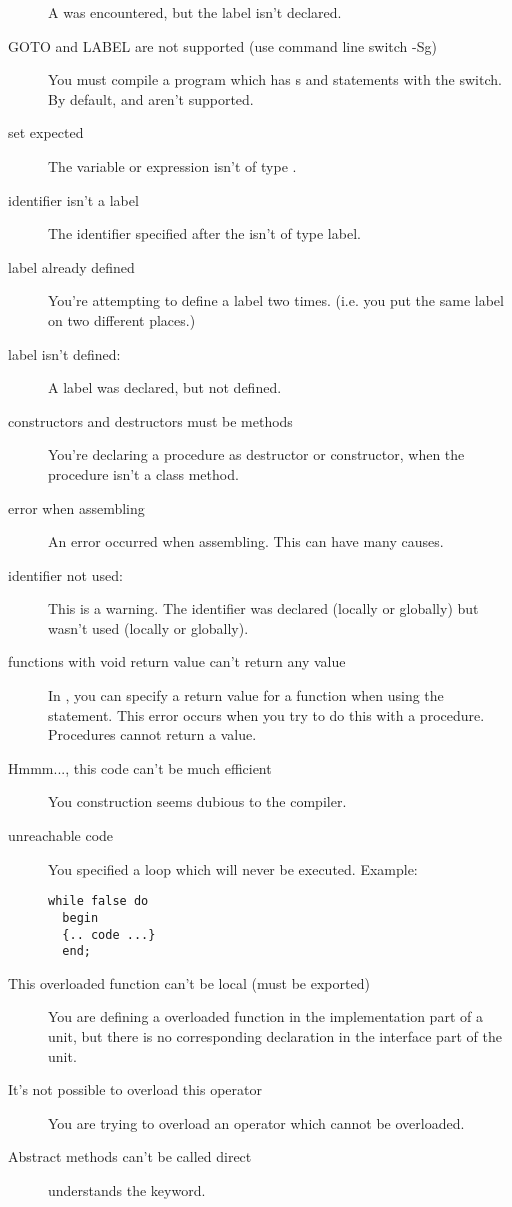 \documentclass{report}
\begin{document}
\begin{description}
A  was encountered, but the label isn't declared. 
\item [GOTO and LABEL are not supported (use command line switch -Sg)]
You must compile a program which has s and  statements 
with the   switch. By default,  and  aren't
supported.
\item [set expected]
The variable or expression isn't of type .
\item [identifier isn't a label]
The identifier specified after the  isn't of type label.
\item [label already defined]
You're attempting to define a label two times. (i.e. you put the same label
on two different places.)
\item [label isn't defined:]
A label was declared, but not defined.
\item [constructors and destructors must be methods]
You're declaring a procedure as destructor or constructor, when the
procedure isn't a class method.
\item [error when assembling]
An error occurred when assembling. This can have many causes.
\item [identifier not used:]
This is a warning. The identifier was declared (locally or globally) but
wasn't used (locally or globally).
\item [functions with void return value can't return any value]
In \fpc, you can specify a return value for a function when using 
the  statement. This error occurs when you try to do this with a
procedure. Procedures  cannot return a value.
\item [Hmmm..., this code can't be much efficient]
You construction seems dubious to the compiler.
\item [unreachable code]
You specified a loop which will never be executed. Example:
\begin{verbatim}
while false do
  begin
  {.. code ...}
  end;
\end{verbatim}
\item [This overloaded function can't be local (must be exported)]
You are defining a overloaded function in the implementation part of a unit,
but there is no corresponding declaration in the interface part of the unit.
\item [It's not possible to overload this operator]
You are trying to overload an operator which cannot be overloaded.
\item [Abstract methods can't be called direct]
\fpc understands the  keyword.

\end{description}
\end{document}
